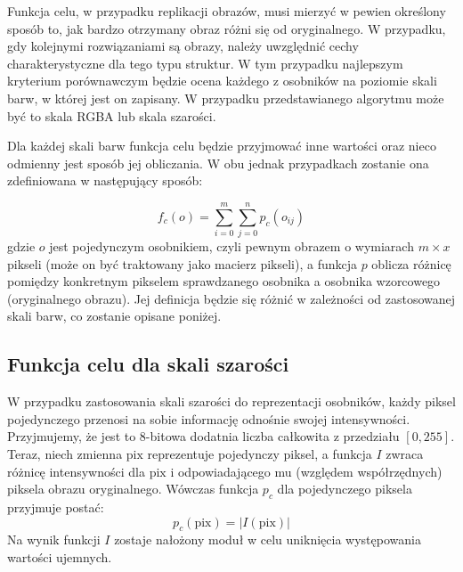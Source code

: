 Funkcja celu, w przypadku replikacji obrazów, musi mierzyć w pewien określony sposób to, jak bardzo otrzymany obraz różni się od oryginalnego. W przypadku, gdy kolejnymi rozwiązaniami są obrazy, należy uwzględnić cechy charakterystyczne dla tego typu struktur. W tym przypadku najlepszym kryterium porównawczym będzie ocena każdego z osobników na poziomie skali barw, w której jest on zapisany. W przypadku przedstawianego algorytmu może być to skala RGBA lub skala szarości. 

Dla każdej skali barw funkcja celu będzie przyjmować inne wartości oraz nieco odmienny jest sposób jej obliczania. W obu jednak przypadkach zostanie ona zdefiniowana w następujący sposób:

\begin{equation}
\label{equ:score_function}
    f_{c}(o) = \sum_{i = 0}^{m} \sum_{j=0}^{n} p_{c}(o_{ij})
\end{equation}
gdzie $o$ jest pojedynczym osobnikiem, czyli pewnym obrazem o wymiarach $m \times x$ pikseli (może on być traktowany jako macierz pikseli), a funkcja $p$ oblicza różnicę pomiędzy konkretnym pikselem sprawdzanego osobnika a osobnika wzorcowego (oryginalnego obrazu). Jej definicja będzie się różnić w zależności od zastosowanej skali barw, co zostanie opisane poniżej.

\subsection{Funkcja celu dla skali szarości}
W przypadku zastosowania skali szarości do reprezentacji osobników, każdy piksel pojedynczego przenosi na sobie informację odnośnie swojej intensywności. Przyjmujemy, że jest to 8-bitowa dodatnia liczba całkowita z przedziału $[0, 255]$. Teraz, niech zmienna $\mathrm{pix}$ reprezentuje pojedynczy piksel, a funkcja $I$ zwraca różnicę intensywności dla $\mathrm{pix}$ i odpowiadającego mu (względem współrzędnych) piksela obrazu oryginalnego. Wówczas funkcja $p_{c}$ dla pojedynczego piksela przyjmuje postać:
\begin{equation}
    p_{c}(\mathrm{pix}) = |I(\mathrm{pix})|
\end{equation}
Na wynik funkcji $I$ zostaje nałożony moduł w celu uniknięcia występowania wartości ujemnych.

